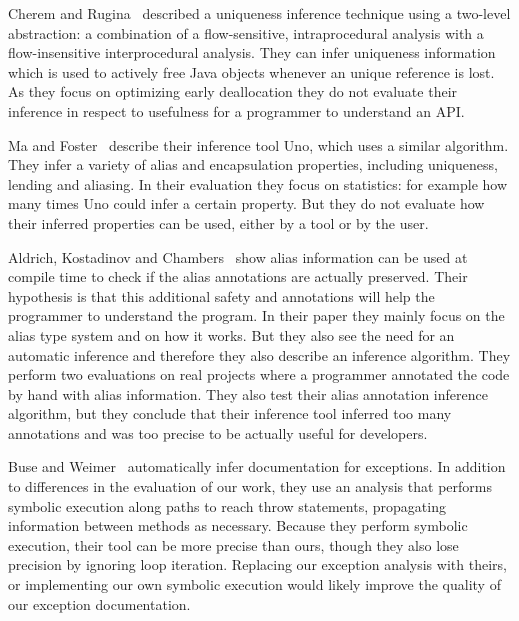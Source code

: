 Cherem and Rugina~\cite{UniquenessInference} described a uniqueness inference
technique using a two-level abstraction: a combination of a flow-sensitive,
intraprocedural analysis with a flow-insensitive interprocedural analysis. 
They can infer uniqueness information which is used to actively free Java
objects whenever an unique reference is lost. As they focus on optimizing 
early deallocation they do not evaluate their inference in respect to usefulness
for a programmer to understand an API.

Ma and Foster~\cite{Uno} describe their inference tool Uno, which uses a similar
algorithm. They infer a variety of alias and encapsulation
properties, including uniqueness, lending and aliasing. In their evaluation
they focus on statistics: for example how many times Uno could infer a certain property.
But they do not evaluate how their inferred properties can be used, either by a tool
or by the user.

Aldrich, Kostadinov and Chambers~\cite{AliasJava} show alias information 
can be used at compile time to check if the alias annotations are actually
preserved. Their hypothesis is that this additional safety and annotations will
help the programmer to understand the program. In their paper they mainly focus
on the alias type system and on how it works. But they also see the need
for an automatic inference and therefore they also describe an inference algorithm.
They perform two evaluations on real projects where a programmer
annotated the code by hand with alias information. They also test their
alias annotation inference algorithm, but they conclude that
their inference tool inferred too many annotations and was too precise to be actually useful
for developers.

Buse and Weimer~\cite{autodoc} automatically infer documentation for
exceptions.  In addition to differences in the evaluation of our work, they use
an analysis that performs symbolic execution along paths to reach throw
statements, propagating information between methods as necessary.
Because they
perform symbolic execution, their tool can be more precise than ours, though
they also lose precision by ignoring loop iteration.
Replacing our exception analysis with theirs, or implementing our own symbolic
execution would likely improve the quality of our exception documentation.
